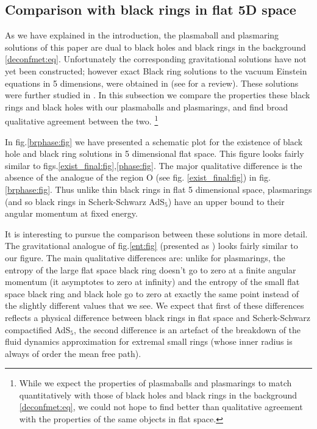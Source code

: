 \documentclass[12pt,a4paper]{article}
\begin{document}
\subsection{Comparison with black rings in flat 5D space}\label{sec:existcomp}

As we have explained in the introduction, the plasmaball and
plasmaring solutions of this paper are dual to black holes and black
rings in the background \eqref{deconfmet:eq}. Unfortunately the
corresponding gravitational solutions have not yet been constructed;
however exact Black ring solutions to the vacuum Einstein equations
in 5 dimensions, were obtained in \cite{Emparan:2001wn} (see
\cite{Emparan:2006mm} for a review). These solutions were further
studied in \cite{Elvang:2006dd}. In this subsection we compare the
properties these black rings and black holes with our plasmaballs
and plasmarings, and find broad qualitative agreement between the
two. \footnote{While we expect the properties of plasmaballs and
plasmarings to match quantitatively with those of black holes and
black rings in the background \eqref{deconfmet:eq}, we could not
hope to find better than qualitative agreement with the properties
of the same objects in flat space.}

In fig.\ref{brphase:fig} we have presented a schematic plot for the
existence of black hole and black ring solutions in 5 dimensional
flat space. This figure looks fairly similar to
figs.\ref{exist_final:fig},\ref{phase:fig}. The major qualitative
difference is the absence of the analogue of the region O (see fig.
\ref{exist_final:fig}) in fig. \ref{brphase:fig}. Thus unlike thin
black rings in flat 5 dimensional space, plasmarings (and so black
rings in Scherk-Schwarz AdS$_5$) have an upper bound to their
angular momentum at fixed energy.

It is interesting to pursue the comparison between these solutions
in more detail. The gravitational analogue of fig.\ref{ent:fig}
(presented as \cite[fig.3]{Emparan:2001wn}) looks fairly similar to
our figure. The main qualitative differences are: unlike for
plasmarings, the entropy of the large flat space black ring doesn't
go to zero at a finite angular momentum (it asymptotes to zero at
infinity) and the entropy of the small flat space black ring and
black hole go to zero at exactly the same point instead of the
slightly different values that we see. We expect that first of these
differences reflects a physical difference between black rings in
flat space and Scherk-Schwarz compactified AdS$_5$, the second
difference is an artefact of the breakdown of the fluid dynamics
approximation for extremal small rings (whose inner radius is always
of order the mean free path).
\end{document}
